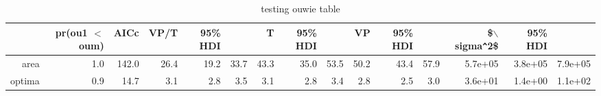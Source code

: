 \begin{table}[ht]
\centering
\caption{testing ouwie table} 
\begingroup\tiny
\begin{tabular}{rrrrrrrrrrrrrrr}
  \hline
 & pr(ou1 $<$ oum) & AICc & VP/T & 95\% HDI &   & T & 95\% HDI &   & VP & 95\% HDI &   & \$$\backslash$sigma\verb|^|2\$ & 95\% HDI &   \\ 
  \hline
area & 1.0 & 142.0 & 26.4 & 19.2 & 33.7 & 43.3 & 35.0 & 53.5 & 50.2 & 43.4 & 57.9 & 5.7e+05 & 3.8e+05 & 7.9e+05 \\ 
  optima & 0.9 & 14.7 & 3.1 & 2.8 & 3.5 & 3.1 & 2.8 & 3.4 & 2.8 & 2.5 & 3.0 & 3.6e+01 & 1.4e+00 & 1.1e+02 \\ 
   \hline
\end{tabular}
\endgroup
\end{table}
